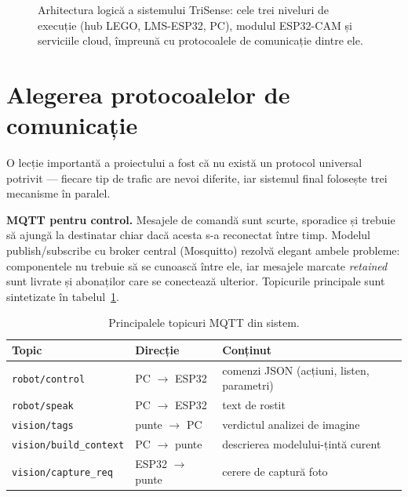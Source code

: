 \begin{figure}[htb]
{%
    }
    \caption{Arhitectura logică a sistemului TriSense: cele trei niveluri de execuție (hub LEGO, LMS-ESP32, PC), modulul ESP32-CAM și serviciile cloud, împreună cu protocoalele de comunicație dintre ele.}
    \label{an:fig:arhitectura}
\end{figure}

\section{Alegerea protocoalelor de comunicație}

O lecție importantă a proiectului a fost că nu există un protocol universal potrivit — fiecare tip de trafic are nevoi diferite, iar sistemul final folosește trei mecanisme în paralel.

\textbf{MQTT pentru control.} Mesajele de comandă sunt scurte, sporadice și trebuie să ajungă la destinatar chiar dacă acesta s-a reconectat între timp. Modelul publish/subscribe cu broker central (Mosquitto) rezolvă elegant ambele probleme: componentele nu trebuie să se cunoască între ele, iar mesajele marcate \emph{retained} sunt livrate și abonaților care se conectează ulterior. Topicurile principale sunt sintetizate în tabelul~\ref{tab:topicuri}.

\begin{table}[htb]
    \centering
    \caption{Principalele topicuri MQTT din sistem.}
    \label{tab:topicuri}
    \begin{tabular}{|l|l|l|}
        \hline
        \textbf{Topic} & \textbf{Direcție} & \textbf{Conținut} \\
        \hline
        \texttt{robot/control} & PC $\rightarrow$ ESP32 & comenzi JSON (acțiuni, listen, parametri) \\
        \texttt{robot/speak} & PC $\rightarrow$ ESP32 & text de rostit \\
        \texttt{vision/tags} & punte $\rightarrow$ PC & verdictul analizei de imagine \\
        \texttt{vision/build\_context} & PC $\rightarrow$ punte & descrierea modelului-țintă curent \\
        \texttt{vision/capture\_req} & ESP32 $\rightarrow$ punte & cerere de captură foto \\
        \hline
    \end{tabular}
\end{table}

